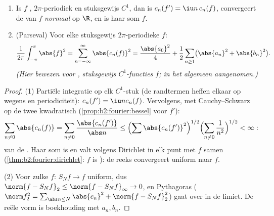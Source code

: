 \begin{theorem}\label{thm:b2:fourier:parseval}
\begin{enumerate}
  \item Is $f$ , $2\pi$-periodiek en stuksgewijs $C^1$, dan
        is $c_n(f') = \iu n\,c_n(f)$, convergeert de 
        van $f$ \emph{normaal} op $\R$, en is haar som $f$.
  \item (Parseval) Voor elke stuksgewijs 
        $2\pi$-periodieke $f$:
        \[
        \frac{1}{2\pi}\int_{-\pi}^{\pi}\abs{f}^2
        = \sum_{n=-\infty}^{\infty} \abs{c_n(f)}^2
        = \frac{\abs{a_0}^2}{4} + \frac12\sum_{n\geq1}
        \bigl(\abs{a_n}^2 + \abs{b_n}^2\bigr).
        \]
        \emph{(Hier bewezen voor , stuksgewijs
        $C^1$-functies $f$; in het algemeen aangenomen.)}
\end{enumerate}
\end{theorem}

\begin{proof}
(1) Partiële integratie op elk $C^1$-stuk (de randtermen heffen
elkaar op wegens  en periodiciteit): $c_n(f') = \iu n
c_n(f)$. Vervolgens, met Cauchy--Schwarz op de twee
kwadratisch 
(\cref{prop:b2:fourier:bessel} voor $f'$):
\[
\sum_{n \neq 0} \abs{c_n(f)} = \sum_{n\neq0}
\frac{\abs{c_n(f')}}{\abs n}
\leq \Bigl(\sum \abs{c_n(f')}^2\Bigr)^{1/2}
\Bigl(\sum_{n\neq0}\frac{1}{n^2}\Bigr)^{1/2} < \infty :
\]
 van de . Haar som is  en
valt volgens Dirichlet in elk punt met $f$ samen
(\cref{thm:b2:fourier:dirichlet}: $f$ is ): de reeks
convergeert uniform naar $f$.

(2) Voor zulke $f$: $S_N f \to f$ uniform, dus $\norm{f - S_Nf}_2
\leq \norm{f - S_Nf}_\infty \to 0$, en Pythagoras ($\norm f_2^2 =
\sum_{\abs n \leq N}\abs{c_n}^2 + \norm{f - S_Nf}_2^2$) gaat over
in de limiet. De reële vorm is boekhouding met $a_n, b_n$.
\end{proof}

